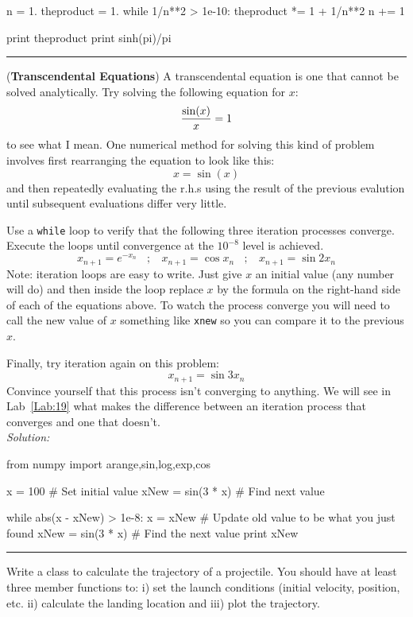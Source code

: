 \begin{enumerate}
\begin{codeexample}
\begin{VerbatimOut}{\listingFile}
n = 1.
theproduct = 1.
while 1/n**2 > 1e-10:
    theproduct *= 1 + 1/n**2
    n += 1

print theproduct
print sinh(pi)/pi
\end{VerbatimOut}
\end{codeexample}
\else
\noindent\rule{5 in}{0.01 in}
\fi


\prob {} (\textbf{Transcendental
Equations})  A transcendental equation is one that cannot be solved
analytically.  Try solving the following equation for
$x$:
\[{\sin(x)\over x} = 1\]
to see what I mean.  One numerical method for solving this kind of
problem involves first rearranging the equation to look like this:
\[x = \sin(x)\] and then repeatedly evaluating the r.h.s using the
result of the previous evalution until subsequent evaluations differ
very little. 

Use a {\tt while} loop to verify that the following three iteration
    processes converge. Execute the loops
    until convergence at the $10^{-8}$ level is achieved.
    \[
        x_{n+1} = e^{-x_n}~~~~;~~~~
        x_{n+1} = \cos{x_n}~~~~;~~~~
        x_{n+1} = \sin{2 x_n}
    \]
    Note: iteration loops are easy to write. Just give $x$ an initial
    value (any number will do) and then inside the loop replace $x$ by
    the formula on the right-hand side of each of the equations
    above. To watch the process converge you will need to call the new
    value of $x$ something like {\tt xnew} so you can compare it to
    the previous $x$.

    Finally, try iteration again on this problem:
    \[
        x_{n+1} = \sin{3 x_n}
    \]
    Convince yourself that this process isn't converging to
    anything. We will see in Lab~\ref{Lab:19} what makes the
    difference between an iteration process that converges and
    one that doesn't.\\
\ifsolutions
\textit{Solution:}\\
\begin{codeexample}
\begin{VerbatimOut}{\listingFile}
from numpy import arange,sin,log,exp,cos

x = 100   # Set initial value
xNew = sin(3 * x)  # Find next value

while abs(x - xNew) > 1e-8:
    x = xNew  # Update old value to be what you just found
    xNew = sin(3 * x)  # Find the next value
    print xNew

\end{VerbatimOut}
\end{codeexample}
\else
\noindent\rule{5 in}{0.01 in}
\fi


\prob Write a class to calculate the trajectory of a projectile.  You should
have at least three member functions to: i) set the launch conditions (initial
velocity, position, etc.  ii) calculate the landing location and iii)
plot the trajectory.
\end{enumerate}


